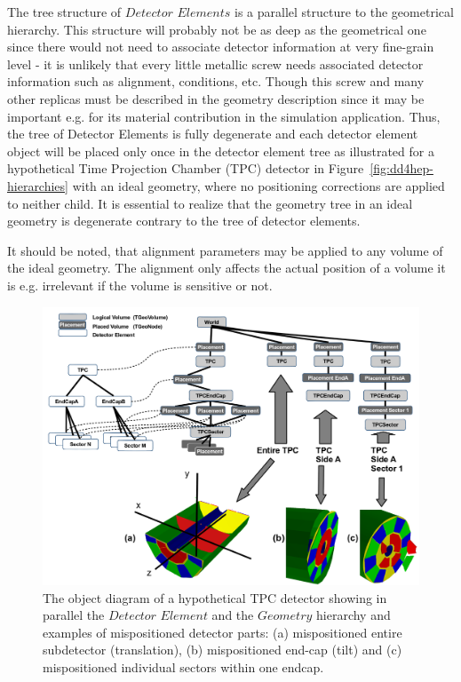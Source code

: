 \documentclass[10pt,a4paper]{article}
\begin{document}
\noindent
The tree structure of
$Detector$ $Elements$ is a parallel structure to the geometrical hierarchy.
This structure will probably not be as deep as the geometrical one since 
there would not need to associate detector information at very fine-grain 
level - it is unlikely that every little metallic screw
needs associated detector information such as alignment, conditions, etc.
Though this screw and many other replicas must be described in the geometry 
description since it may be important e.g. for its material contribution 
in the simulation application. Thus, the tree of Detector Elements is
fully degenerate and each detector element object will be placed only 
once in the detector element tree as illustrated for a hypothetical
Time Projection Chamber (TPC) detector in 
Figure~\ref{fig:dd4hep-hierarchies} with an ideal geometry,
where no positioning corrections are applied to neither child. 
It is essential to realize that the geometry tree in an ideal geometry is
degenerate contrary to the tree of detector elements.

\noindent
It should be noted, that alignment parameters may be applied to any volume 
of the ideal geometry. The alignment only affects the actual position of 
a volume it is e.g. irrelevant if the volume is sensitive or not.

\begin{figure}[h]
  \begin{center}
    \includegraphics[width=160mm] {DDAlign_detelement_aligned_tree}
    \caption{The object diagram of a hypothetical TPC detector showing in
    parallel the $Detector$ $Element$ and the $Geometry$ hierarchy and examples
    of mispositioned detector parts: (a) mispositioned entire subdetector 
    (translation), (b) mispositioned end-cap (tilt) and (c) mispositioned
    individual sectors within one endcap.}
    \label{fig:dd4hep-aligned-hierarchies}
  \end{center}
\end{figure}
\end{document}
